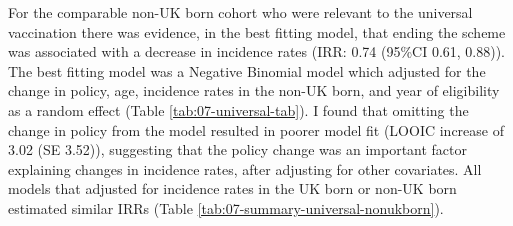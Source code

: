 \documentclass[11pt,twoside]{bristolthesis}
\begin{document}
  For the comparable non-UK born cohort who were relevant to the universal vaccination there was evidence, in the best fitting model, that ending the scheme was associated with a decrease in incidence rates (IRR: 0.74 (95\%CI 0.61, 0.88)). The best fitting model was a Negative Binomial model which adjusted for the change in policy, age, incidence rates in the non-UK born, and year of eligibility as a random effect (Table \ref{tab:07-universal-tab}). I found that omitting the change in policy from the model resulted in poorer model fit (LOOIC increase of 3.02 (SE 3.52)), suggesting that the policy change was an important factor explaining changes in incidence rates, after adjusting for other covariates. All models that adjusted for incidence rates in the UK born or non-UK born estimated similar IRRs (Table \ref{tab:07-summary-universal-nonukborn}).
  \begin{landscape}\begin{table}[!h]
  

\end{table}
\end{landscape}
\end{document}
